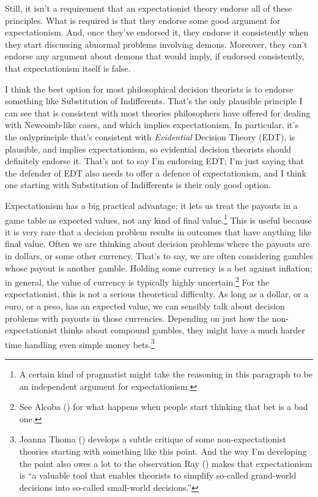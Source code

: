 \documentclass[
  12pt,
  letterpaper,
  DIV=11,
  numbers=noendperiod]{scrreprt}
\begin{document}
Still, it isn't a requirement that an expectationist theory endorse all
of these principles. What is required is that they endorse some good
argument for expectationism. And, once they've endorsed it, they endorse
it consistently when they start discussing abnormal problems involving
demons. Moreover, they can't endorse any argument about demons that
would imply, if endorsed consistently, that expectationism itself is
false.

I think the best option for most philosophical decision theorists is to
endorse something like Substitution of Indifferents. That's the only
plausible principle I can see that is consistent with most theories
philosophers have offered for dealing with Newcomb-like cases, and which
implies expectationism. In particular, it's the onlyprinciple that's
consistent with \emph{Evidential} Decision Theory (EDT), is plausible,
and implies expectationism, so evidential decision theorists should
definitely endorse it. That's not to say I'm endorsing EDT; I'm just
saying that the defender of EDT also needs to offer a defence of
expectationism, and I think one starting with Substitution of
Indifferents is their only good option.

Expectationism has a big practical advantage; it lets us treat the
payouts in a game table as expected values, not any kind of final
value.\footnote{A certain kind of pragmatist might take the reasoning in
  this paragraph to be an independent argument for expectationism.} This
is useful because it is very rare that a decision problem results in
outcomes that have anything like final value. Often we are thinking
about decision problems where the payouts are in dollars, or some other
currency. That's to say, we are often considering gambles whose payout
is another gamble. Holding some currency is a bet against inflation; in
general, the value of currency is typically highly uncertain.\footnote{See
  Alcoba () for what happens when people
  start thinking that bet is a bad one.} For the expectationist, this is
not a serious theoretical difficulty. As long as a dollar, or a euro, or
a peso, has an expected value, we can sensibly talk about decision
problems with payouts in those currencies. Depending on just how the
non-expectationist thinks about compound gambles, they might have a much
harder time handling even simple money bets.\footnote{Joanna Thoma
  () develops a subtle critique of some
  non-expectationist theories starting with something like this point.
  And the way I'm developing the point also owes a lot to the
  observation Ray ()
  makes that expectationism is ``a valuable tool that enables theorists
  to simplify so-called grand-world decisions into so-called small-world
  decisions.''}
\end{document}
